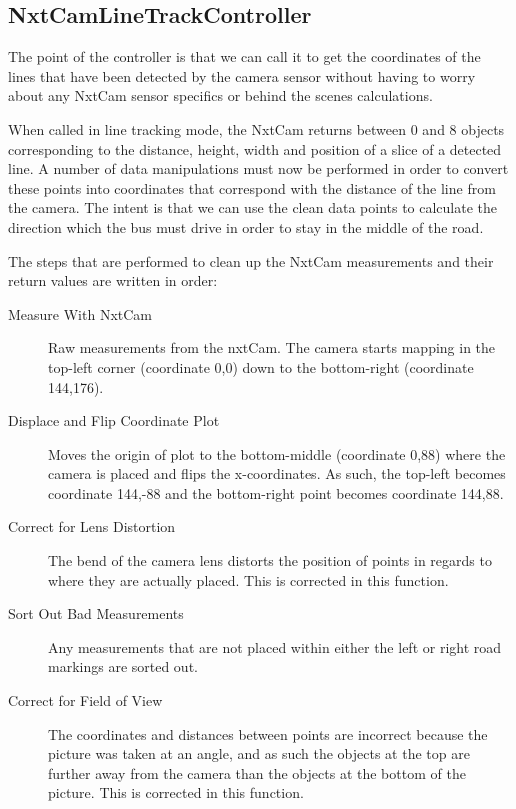 \subsection{NxtCamLineTrackController}

The point of the controller is that we can call it to get the coordinates of the lines that have been detected by the camera sensor without having to worry about any NxtCam sensor specifics or behind the scenes calculations. 

When called in line tracking mode, the NxtCam returns between 0 and 8 objects corresponding to the distance, height, width and position of a slice of a detected line. A number of data manipulations must now be performed in order to convert these points into coordinates that correspond with the distance of the line from the camera. The intent is that we can use the clean data points to calculate the direction which the bus must drive in order to stay in the middle of the road. 

The steps that are performed to clean up the NxtCam measurements and their return values are written in order: 


\begin{description}
    \item[Measure With NxtCam]
    Raw measurements from the nxtCam. The camera starts mapping in the top-left corner (coordinate 0,0) down to the bottom-right (coordinate 144,176).
    \item[Displace and Flip Coordinate Plot]
    Moves the origin of plot to the bottom-middle (coordinate 0,88) where the camera is placed and flips the x-coordinates. As such, the top-left becomes coordinate 144,-88 and the bottom-right point becomes coordinate 144,88. 
    \item[Correct for Lens Distortion]
    The bend of the camera lens distorts the position of points in regards to where they are actually placed. This is corrected in this function. 
    \item[Sort Out Bad Measurements]
    Any measurements that are not placed within either the left or right road markings are sorted out. 
    \item[Correct for Field of View]
    The coordinates and distances between points are incorrect because the picture was taken at an angle, and as such the objects at the top are further away from the camera than the objects at the bottom of the picture. This is corrected in this function. 
\end{description}

